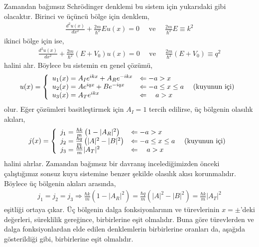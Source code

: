 \documentclass[a4paper,12pt, twoside]{article}
\begin{document}
Zamandan bağımsız Schrödinger denklemi bu sistem için yukarıdaki gibi olacaktır. Birinci ve üçüncü bölge için denklem,
\begin{align}
\frac { d ^ { 2 } u ( x ) } { d x ^ { 2 } } +  \frac { 2 m} { \hbar ^ { 2 } } E u ( x ) = 0 \quad \text{ ve } \quad \frac { 2 m} { \hbar ^ { 2 } } E \equiv k ^ { 2 }
\end{align}
ikinci bölge için ise,
\begin{align}
\frac { d ^ { 2 } u ( x ) } { d x ^ { 2 } } +  \frac { 2 m} { \hbar ^ { 2 } }  \left( E + V _ { 0 } \right) u ( x ) = 0 \quad \text{ ve } \quad \frac { 2 m} { \hbar ^ { 2 } }  \left( E + V _ { 0 } \right) \equiv q ^ { 2 }
\end{align}
halini alır. Böylece bu sistemin en genel çözümü,
\begin{align}
u ( x )  = \left\{ 
\begin{array} { l l } 
{u_1(x) = A_I e^{i k x} + A_R e^{-i k x} } & {\Leftarrow -a > x } \\
{u_2(x) = A e^{i q x} + B e^{-i q x} } & {\Leftarrow -a \leq x \leq a } \quad \text{ (kuyunun içi)} \\
{u_3(x) = A_T e^{i k x}} & {\Leftarrow \quad a > x }
\end{array} \right. 
\end{align}
olur. Eğer çözümleri basitleştirmek için $A_I=1$ tercih edilirse, üç bölgenin olasılık akıları,
\begin{align}
j ( x )  = \left\{ 
\begin{array} { l l } 
{j_1 = \frac{\hbar k}{m}\left(1-|A_R|^{2}\right) } & {\Leftarrow -a > x } \\
{j_2 = \frac{\hbar q}{m}\left(|A|^{2}-|B|^{2}\right) } & {\Leftarrow -a \leq x \leq a } \quad \text{ (kuyunun içi)} \\
{j_3 = \frac{\hbar k}{m}|A_T|^{2}} & {\Leftarrow \quad a > x }
\end{array} \right. 
\end{align}
halini alırlar. Zamandan bağımsız bir davranış incelediğimizden önceki çalıştığımız sonsuz kuyu sistemine benzer şekilde olasılık akısı korunmalıdır. Böylece üç bölgenin akıları arasında,
\begin{align}
	j_1 = 	j_2 = 	j_3 \Longrightarrow \frac{\hbar k}{m}\left(1-|A_R|^{2}\right)=\frac{\hbar q}{m}\left(|A|^{2}-|B|^{2}\right)=\frac{\hbar k}{m}|A_T|^{2}
	\label{eq:sonlukuyu_j1j2j3}
\end{align}
eşitliği ortaya çıkar. Üç bölgenin dalga fonksiyonlarının ve türevlerinin $x=\pm$'deki değerleri, süreklilik gereğince, birbirlerine eşit olmalıdır. Buna göre türevlerden ve dalga fonksiyonlardan elde edilen denklemlerin birbirlerine oranları da, aşağıda gösterildiği gibi, birbirlerine eşit olmalıdır. 
\end{document}
